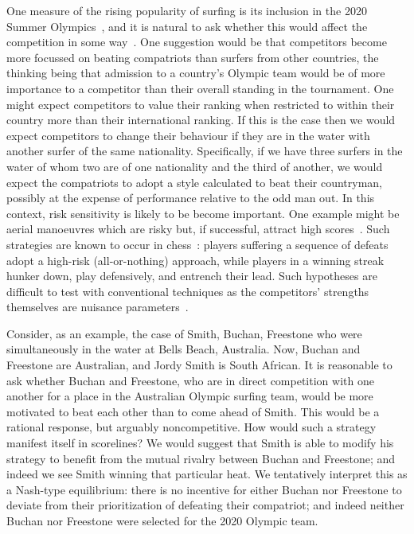 \documentclass{article}
\begin{document}
One measure of the rising popularity of surfing is its inclusion in
the 2020 Summer Olympics~\citep{tulloch2019}, and it is natural to ask
whether this would affect the competition in some way~\citep{ho2021}.
One suggestion would be that competitors become more focussed on
beating compatriots than surfers from other countries, the thinking
being that admission to a country's Olympic team would be of more
importance to a competitor than their overall standing in the
tournament.  One might expect competitors to value their ranking when
restricted to within their country more than their international
ranking.  If this is the case then we would expect competitors to
change their behaviour if they are in the water with another surfer of
the same nationality.  Specifically, if we have three surfers in the
water of whom two are of one nationality and the third of another, we
would expect the compatriots to adopt a style calculated to beat their
countryman, possibly at the expense of performance relative to the odd
man out.  In this context, risk sensitivity is likely to be become
important.  One example might be aerial manoeuvres which are risky
but, if successful, attract high scores~\citep{lundgren2014}.  Such
strategies are known to occur in chess~\citep{hankin2020}: players
suffering a sequence of defeats adopt a high-risk (all-or-nothing)
approach, while players in a winning streak hunker down, play
defensively, and entrench their lead.  Such hypotheses are difficult
to test with conventional techniques as the competitors' strengths
themselves are nuisance parameters~\citep{basu1977}.

Consider, as an example, the case of Smith, Buchan, Freestone who were
simultaneously in the water at Bells Beach, Australia.  Now, Buchan
and Freestone are Australian, and Jordy Smith is South African.  It is
reasonable to ask whether Buchan and Freestone, who are in direct
competition with one another for a place in the Australian Olympic
surfing team, would be more motivated to beat each other than to
come ahead of Smith.  This would be a rational response, but arguably
noncompetitive.  How would such a strategy manifest itself in
scorelines?  We would suggest that Smith is able to modify his
strategy to benefit from the mutual rivalry between Buchan and
Freestone; and indeed we see Smith winning that particular heat.  We
tentatively interpret this as a Nash-type equilibrium: there is no
incentive for either Buchan nor Freestone to deviate from their
prioritization of defeating their compatriot; and indeed neither
Buchan nor Freestone were selected for the 2020 Olympic team.
\end{document}
